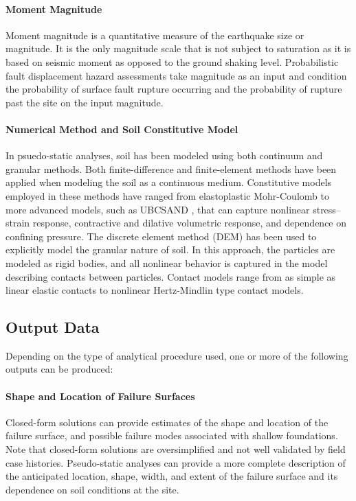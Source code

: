 \paragraph{Moment Magnitude}
Moment magnitude is a quantitative measure of the earthquake size or magnitude. It is the only magnitude scale that is not subject to saturation as it is based on seismic moment as opposed to the ground shaking level. Probabilistic fault displacement hazard assessments take magnitude as an input and condition the probability of surface fault rupture occurring and the probability of rupture past the site on the input magnitude.

\paragraph{Numerical Method and Soil Constitutive Model}
In psuedo-static analyses, soil has been modeled using both continuum and granular methods. Both finite-difference and finite-element methods have been applied when modeling the soil as a continuous medium. Constitutive models employed in these methods have ranged from elastoplastic Mohr-Coulomb to more advanced models, such as UBCSAND \citep{byrne2004numerical}, that can capture nonlinear stress--strain response, contractive and dilative volumetric response, and dependence on confining pressure. The discrete element method (DEM) has been used to explicitly model the granular nature of soil. In this approach, the particles are modeled as rigid bodies, and all nonlinear behavior is captured in the model describing contacts between particles. Contact models range from as simple as linear elastic contacts to nonlinear Hertz-Mindlin type contact models.

\subsection{Output Data}
Depending on the type of analytical procedure used, one or more of the following outputs can be produced:

\paragraph{Shape and Location of Failure Surfaces}
Closed-form solutions can provide estimates of the shape and location of the failure surface, and possible failure modes associated with shallow foundations. Note that closed-form solutions are oversimplified and not well validated by field case histories. Pseudo-static analyses can provide a more complete description of the anticipated location, shape, width, and extent of the failure surface and its dependence on soil conditions at the site. %


